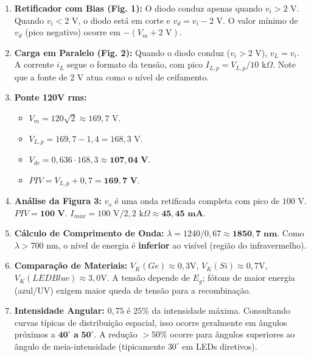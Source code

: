 \documentclass[a4paper,12pt]{article}
\begin{document}
\begin{enumerate}[label=\textbf{Questão \arabic*:}, leftmargin=*]

    \item \textbf{Retificador com Bias (Fig. 1):} O diodo conduz apenas quando $v_i > 2\text{ V}$. Quando $v_i < 2\text{ V}$, o diodo está em corte e $v_d = v_i - 2\text{ V}$. O valor mínimo de $v_d$ (pico negativo) ocorre em $-(V_m + 2\text{ V})$.
    
    \item \textbf{Carga em Paralelo (Fig. 2):} Quando o diodo conduz ($v_i > 2\text{ V}$), $v_L = v_i$. A corrente $i_L$ segue o formato da tensão, com pico $I_{L,p} = V_{L,p} / 10\text{ k}\Omega$. Note que a fonte de $2\text{ V}$ atua como o nível de ceifamento.

    \item \textbf{Ponte 120V rms:} 
    \begin{itemize}
        \item $V_m = 120\sqrt{2} \approx 169,7\text{ V}$. 
        \item $V_{L,p} = 169,7 - 1,4 = 168,3\text{ V}$. 
        \item $V_{dc} = 0,636 \cdot 168,3 \approx \mathbf{107,04\text{ V}}$.
        \item $PIV = V_{L,p} + 0,7 = \mathbf{169,7\text{ V}}$.
    \end{itemize}

    \item \textbf{Análise da Figura 3:} $v_o$ é uma onda retificada completa com pico de $100\text{ V}$. $PIV = \mathbf{100\text{ V}}$. $I_{max} = 100\text{ V} / 2,2\text{ k}\Omega \approx \mathbf{45,45\text{ mA}}$.

    \item \textbf{Cálculo de Comprimento de Onda:} 
    $\lambda = 1240 / 0,67 \approx \mathbf{1850,7\text{ nm}}$. Como $\lambda > 700\text{ nm}$, o nível de energia é \textbf{inferior} ao visível (região do infravermelho).

    \item \textbf{Comparação de Materiais:} $V_K(Ge) \approx 0,3\text{V}$, $V_K(Si) \approx 0,7\text{V}$, $V_K(LED Blue) \approx 3,0\text{V}$. A tensão depende de $E_g$; fótons de maior energia (azul/UV) exigem maior queda de tensão para a recombinação.

    \item \textbf{Intensidade Angular:} $0,75$ é $25\%$ da intensidade máxima. Consultando curvas típicas de distribuição espacial, isso ocorre geralmente em ângulos próximos a $\mathbf{40^\circ \text{ a } 50^\circ}$. A redução $> 50\%$ ocorre para ângulos superiores ao ângulo de meia-intensidade (tipicamente $30^\circ$ em LEDs diretivos).


\end{enumerate}
\end{document}
